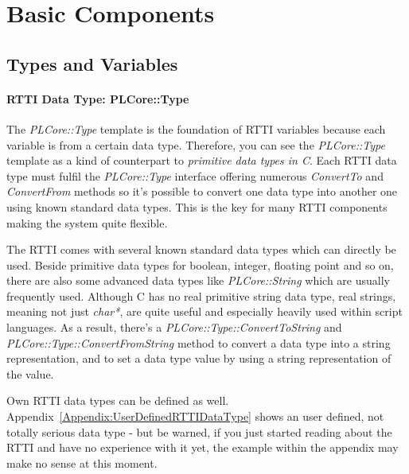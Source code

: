 \section{Basic Components}




\subsection{Types and Variables}
\paragraph{\ac{RTTI} Data Type: PLCore::Type}
The \emph{PLCore::Type} template is the foundation of \ac{RTTI} variables because each variable is from a certain data type. Therefore, you can see the \emph{PLCore::Type} template as a kind of counterpart to \emph{primitive data types in C}. Each \ac{RTTI} data type must fulfil the \emph{PLCore::Type} interface offering numerous \emph{ConvertTo} and \emph{ConvertFrom} methods so it's possible to convert one data type into another one using known standard data types. This is the key for many \ac{RTTI} components making the system quite flexible.

The \ac{RTTI} comes with several known standard data types which can directly be used. Beside primitive data types for boolean, integer, floating point and so on, there are also some advanced data types like \emph{PLCore::String} which are usually frequently used. Although C has no real primitive string data type, real strings, meaning not just \emph{char*}, are quite useful and especially heavily used within script languages. As a result, there's a \emph{PLCore::Type::ConvertToString} and \emph{PLCore::Type::ConvertFromString} method to convert a data type into a string representation, and to set a data type value by using a string representation of the value.

Own \ac{RTTI} data types can be defined as well. Appendix~\ref{Appendix:UserDefinedRTTIDataType} shows an user defined, not totally serious data type - but be warned, if you just started reading about the \ac{RTTI} and have no experience with it yet, the example within the appendix may make no sense at this moment.


